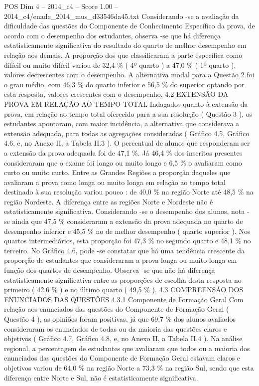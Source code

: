 \begin{textsample}{POS Dim 4 – 2014\_c4 – Score 1.00 – 2014\_c4/enade\_2014\_mus\_d33546da45.txt}
Considerando -se a avaliação da dificuldade das questões do Componente de Conhecimento Específico da prova, de acordo com o desempenho dos estudantes, observa -se que há diferença estatisticamente significativa do resultado do quarto de melhor desempenho em relação aos demais.
A proporção dos que classificaram a parte específica como difícil ou muito difícil variou de 32,4 \% ( 4º quarto ) a 47,0 \% ( 1º quarto ), valores decrescentes com o desempenho.
A alternativa modal para a Questão 2 foi o grau médio, com 46,3 \% do quarto inferior e 56,5 \% do superior optando por esta resposta, valores crescentes com o desempenho. 4.2 EXTENSÃO DA PROVA EM RELAÇÃO AO TEMPO TOTAL Indagados quanto à extensão da prova, em relação ao tempo total oferecido para a sua resolução ( Questão 3 ), os estudantes apontaram, com maior incidência, a alternativa que considerava a extensão adequada, para todas as agregações consideradas ( Gráfico 4.5, Gráfico 4.6, e, no Anexo II, a Tabela II.3 ).
O percentual de alunos que responderam ser a extensão da prova adequada foi de 47,1 \%.
Já 46,4 \% dos inscritos presentes consideraram que o exame foi longo ou muito longo e 6,5 \% o avaliaram como curto ou muito curto.
Entre as Grandes Regiões a proporção daqueles que avaliaram a prova como longa ou muito longa em relação ao tempo total destinado à sua resolução variou pouco : de 40,0 \% na região Norte até 48,5 \% na região Nordeste.
A diferença entre as regiões Norte e Nordeste não é estatisticamente significativa.
Considerando -se o desempenho dos alunos, nota -se ainda que 47,5 \% consideraram a extensão da prova adequada no quarto de desempenho inferior e 45,5 \% no de melhor desempenho ( quarto superior ).
Nos quartos intermediários, esta proporção foi 47,3 \% no segundo quarto e 48,1 \% no terceiro.
No Gráfico 4.6, pode -se constatar que há uma tendência crescente da proporção de estudantes que consideraram a prova longa ou muito longa em função dos quartos de desempenho.
Observa -se que não há diferença estatisticamente significativa entre as proporções de escolha desta resposta no primeiro ( 42,6 \% ) e no último quarto ( 49,5 \% ). 4.3 COMPREENSÃO DOS ENUNCIADOS DAS QUESTÕES 4.3.1 Componente de Formação Geral Com relação aos enunciados das questões do Componente de Formação Geral ( Questão 4 ), as opiniões foram positivas, já que 69,7 \% dos alunos avaliados consideraram os enunciados de todas ou da maioria das questões claros e objetivos ( Gráfico 4.7, Gráfico 4.8, e, no Anexo II, a Tabela II.4 ).
Na análise regional, a percentagem de estudantes que avaliaram que todos ou a maioria dos enunciados das questões do Componente de Formação Geral estavam claros e objetivos variou de 64,0 \% na região Norte a 73,3 \% na região Sul, sendo que esta diferença entre Norte e Sul, não é estatisticamente significativa.

\end{textsample}
